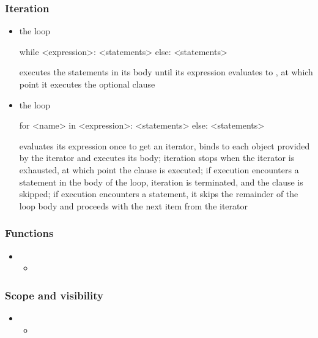 \begin{frame}[fragile]
%
  \frametitle{Iteration}
%
  \begin{itemize}
%
  \item the  loop
    \begin{ipython}{}
      while <expression>:
          <statements>
      else:
          <statements>
    \end{ipython}
    executes the statements in its body until its expression evaluates to , at
    which point it executes the optional  clause
%
  \item the  loop 
    \begin{ipython}{}
      for <name> in <expression>:
          <statements>
      else:
          <statements>
    \end{ipython}
    evaluates its expression once to get an iterator, binds  to each object
    provided by the iterator and executes its body; iteration stops when the iterator is
    exhausted, at which point the  clause is executed; if execution encounters a
     statement in the body of the loop, iteration is terminated, and the
     clause is skipped; if execution encounters a  statement,
    it skips the remainder of the loop body and proceeds with the next item from the iterator
%
  \end{itemize}
%
\end{frame}

\begin{frame}[fragile]
%
  \frametitle{Functions}
%
  \begin{itemize}
%
  \item 
    \begin{itemize}
    \item
    \end{itemize}
%
  \end{itemize}
%
\end{frame}

\begin{frame}[fragile]
%
  \frametitle{Scope and visibility}
%
  \begin{itemize}
%
  \item 
    \begin{itemize}
    \item
    \end{itemize}
%
  \end{itemize}
%
\end{frame}

